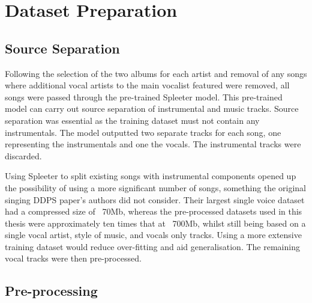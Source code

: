 \section{Dataset Preparation}

\subsection{Source Separation}

Following the selection of the two albums for each artist and removal of any songs where additional vocal artists to the main vocalist featured were removed, all songs were passed through the pre-trained Spleeter model\cite{SpleeterPip}\cite{SpleeterPip}. This pre-trained model can carry out source separation of instrumental and music tracks. Source separation was essential as the training dataset must not contain any instrumentals. The model outputted two separate tracks for each song, one representing the instrumentals and one the vocals. The instrumental tracks were discarded.

Using Spleeter to split existing songs with instrumental components opened up the possibility of using a more significant number of songs, something the original singing DDPS paper's authors did not consider. Their largest single voice dataset had a compressed size of ~70Mb, whereas the pre-processed datasets used in this thesis were approximately ten times that at ~700Mb, whilst still being based on a single vocal artist, style of music, and vocals only tracks. Using a more extensive training dataset would reduce over-fitting and aid generalisation. The remaining vocal tracks were then pre-processed.

\subsection{Pre-processing}

